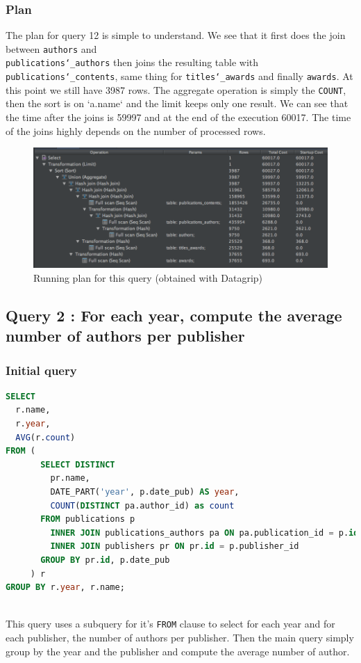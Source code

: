 \documentclass[doubleside, titlepage]{article}
\begin{document}
\subsubsection{Plan}
The plan for query 12 is simple to understand. We see that it first does the join between \texttt{authors} and ~\\ \texttt{publications\char`_authors} then joins the resulting table with \texttt{publications\char`_contents}, same thing for \texttt{titles\char`_awards} and finally \texttt{awards}. At this point we still have 3987 rows. The aggregate operation is simply the \texttt{COUNT}, then the sort is on `a.name` and the limit keeps only one result.
We can see that the time after the joins is 59997 and at the end of the execution 60017. The time of the joins highly depends on the number of processed rows.

\begin{figure}[!htb]
	\centering
    \includegraphics[scale = 0.5]{./query_analysis/query12}
    \caption{Running plan for this query (obtained with Datagrip)}
\end{figure}


\subsection{Query 2 : For each year, compute the average number of authors per publisher}

\subsubsection{Initial query}
		\begin{lstlisting}[language=SQL,showspaces=false,basicstyle=\ttfamily,numberstyle=\tiny,commentstyle=\color{gray}]
SELECT
  r.name,
  r.year,
  AVG(r.count)
FROM (
       SELECT DISTINCT
         pr.name,
         DATE_PART('year', p.date_pub) AS year,
         COUNT(DISTINCT pa.author_id) as count
       FROM publications p
         INNER JOIN publications_authors pa ON pa.publication_id = p.id
         INNER JOIN publishers pr ON pr.id = p.publisher_id
       GROUP BY pr.id, p.date_pub
     ) r
GROUP BY r.year, r.name;
		\end{lstlisting}
~\\	
This query uses a subquery for it's \texttt{FROM} clause to select for each year and for each publisher, the number of authors per publisher. Then the main query simply group by the year and the publisher and compute the average number of author.~\\
\end{document}
